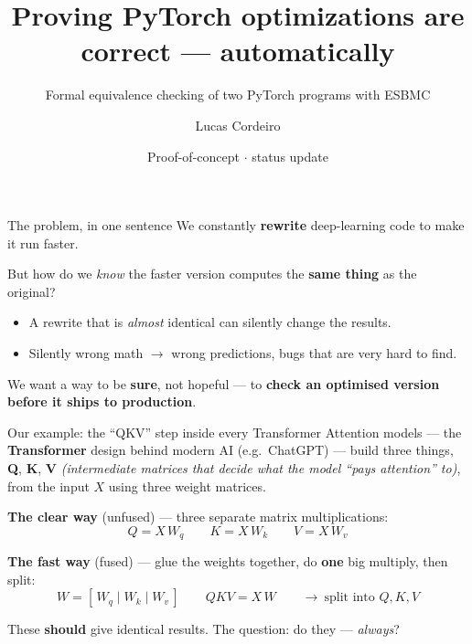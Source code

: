 \documentclass[aspectratio=169,11pt]{beamer}
\title[PyTorch $\equiv$ checking with ESBMC]{Proving PyTorch optimizations are correct --- automatically}
\subtitle{Formal equivalence checking of two PyTorch programs with ESBMC}
\date{Proof-of-concept $\cdot$ status update}
\author{Lucas Cordeiro}
\institute{University of Manchester}
\begin{document}
{
}

\begin{frame}{The problem, in one sentence}
  We constantly \textbf{rewrite} deep-learning code to make it run faster.

  \bigskip
  But how do we \emph{know} the faster version computes the
  \textcolor{warn}{\textbf{same thing}} as the original?

  \bigskip
  \begin{itemize}
    \item A rewrite that is \emph{almost} identical can silently change the results.
    \item Silently wrong math $\rightarrow$ wrong predictions, bugs that are very hard to find.
  \end{itemize}

  \bigskip
  \begin{block}{}
    \centering We want a way to be \textbf{sure}, not hopeful --- to
    \textbf{check an optimised version before it ships to production}.
  \end{block}
\end{frame}

\begin{frame}{Our example: the ``QKV'' step inside every Transformer}
  Attention models --- the \textbf{Transformer} design behind modern AI (e.g.\ ChatGPT) ---
  build three things, \textbf{Q}, \textbf{K}, \textbf{V} \emph{(intermediate matrices that
  decide what the model ``pays attention'' to)}, from the input $X$ using three weight matrices.

  \bigskip
  \textbf{The clear way} (unfused) --- three separate matrix multiplications:
  \[ Q = X\,W_q \qquad K = X\,W_k \qquad V = X\,W_v \]

  \textbf{The fast way} (fused) --- glue the weights together, do \textbf{one} big
  multiply, then split:
  \[ W = [\,W_q \mid W_k \mid W_v\,] \qquad \mathit{QKV} = X\,W \qquad \rightarrow\ \text{split into } Q,K,V \]

  \bigskip
  These \textbf{should} give identical results. The question: do they --- \textcolor{warn}{\emph{always}}?
\end{frame}
\end{document}
